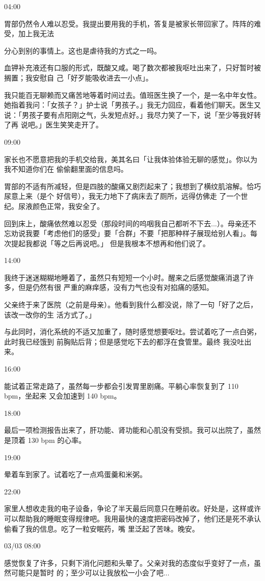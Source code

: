 \documentclass{article}
\begin{document}
04:00 

胃部仍然令人难以忍受。我提出要用我的手机，答复是被家长带回家了。阵阵的难受，加上我无法
\newpage

分心到别的事情上。这也是虐待我的方式之一吗。 

血钾补充液还有口服的形式，既酸又咸。喝了数次都被我呕吐出来了，只好暂时被搁置；我安慰自
己「好歹能吸收进去一小点」。 

我只能百无聊赖而又痛苦地等着时间过去。值班医生换了一个，是一名中年女性。她指着我问：「女孩子？」护士说「男孩子。」我无力回应，看着他们聊天。医生又说：「男孩子要有点阳刚之气，头发短点好。」我尽力笑了一下，说「至少等我好转了再
说吧。」医生笑笑走开了。 


09:00 

家长也不愿意把我的手机交给我，美其名曰「让我体验体验无聊的感觉」。你以为我不知道你们在
偷偷翻里面的信息吗。 

胃部的不适有所减轻，但是四肢的酸痛又剧烈起来了；我想到了横纹肌溶解。恰巧尿意上来（是个
\newpage
好信号），我无力地下了病床去了厕所，远得仿佛走
了一个世纪。尿液颜色正常，我安全了。 

回到床上，酸痛依然难以忍受（那段时间的呜咽我自己都听不下去...）。母亲还不忘劝说我要「考虑他们的感受」要「合群」不要「把那种样子展现给别人看」。每次提起我都说「等之后再说吧。」
但是我根本不想再和他们说了。 


14:00 

我终于迷迷糊糊地睡着了，虽然只有短短一个小时。醒来之后感觉酸痛消退了许多，但是仍然有很
严重的麻痒感，没有力气也没有对掐痛的感知。 

父亲终于来了医院（之前是母亲）。他看到我什么都没说，除了一句「好了之后，该改一改你的生
活方式了。」 

与此同时，消化系统的不适又加重了，随时感觉想要呕吐。尝试着吃了一点白粥，此时我已经饿到
\newpage
前胸贴后背；但是感觉吃下去的都浮在食管里。最终
我没吐出来。 


16:00 

能试着正常走路了，虽然每一步都会引发胃里剧痛。平躺心率恢复到了 110 bpm，坐起来
又会加速到 140 bpm。 


18:00 

最后一项检测报告出来了，肝功能、肾功能和心肌没有受损。我可以出院了，虽然是顶着 130
 bpm 的心率。 


19:00 

晕着车到家了。试着吃了一点鸡蛋羹和米粥。


22:00 

\newpage

家里人想收走我的电子设备，争论了半天最后同意只在睡前收。好处是，这样或许可以帮助我的睡眠变得规律吧。我用最快的速度把密码改掉了，他们还是死不承认偷看了我的信息。吃了一粒安眠药，嘴
里泛起了苦味。晚安。 


03/03 08:00 

感觉恢复了许多，只剩下消化问题和头晕了。父亲对我的态度似乎变好了一点，虽然可能只是暂时
的；至少可以让我放松一小会了吧... 
\end{document}
